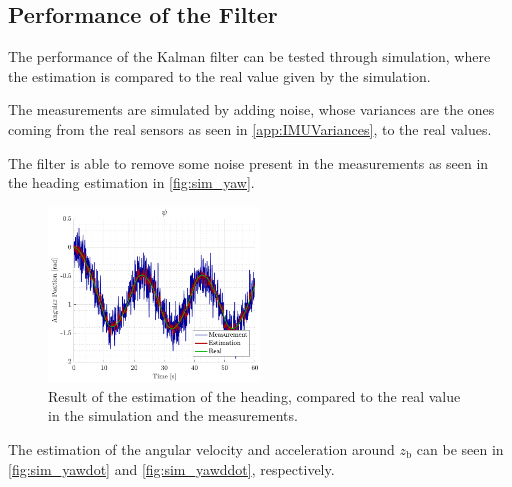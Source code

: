 \subsection{Performance of the Filter}
The performance of the Kalman filter can be tested through simulation, where the estimation is compared to the real value given by the simulation.

The measurements are simulated by adding noise, whose variances are the ones coming from the real sensors as seen in \autoref{app:IMUVariances}, to the real values.

 The filter is able to remove some noise present in the measurements as seen in the heading estimation in \autoref{fig:sim_yaw}.
\begin{figure}[H]
    \includegraphics[width=0.5\textwidth]{figures/sim_yaw}
    \caption{Result of the estimation of the heading, compared to the real value in the simulation and the measurements.}
    \label{fig:sim_yaw}
\end{figure}
%
The estimation of the angular velocity and acceleration around $z_\mathrm{b}$ can be seen in \autoref{fig:sim_yawdot} and \ref{fig:sim_yawddot}, respectively.
%
